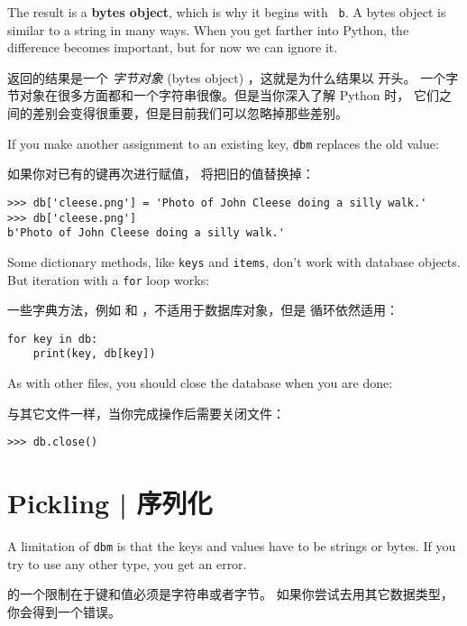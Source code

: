 {{{{{{{%
The result is a {\bf bytes object}, which is why it begins with {\tt
  b}.  A bytes object is similar to a string in many ways.  When you
get farther into Python, the difference becomes important, but for now
we can ignore it.

返回的结果是一个 {\em 字节对象} (bytes object) ，这就是为什么结果以  开头。
一个字节对象在很多方面都和一个字符串很像。但是当你深入了解 Python 时，
它们之间的差别会变得很重要，但是目前我们可以忽略掉那些差别。

  

If you make another assignment to an existing key, {\tt dbm} replaces
the old value:

如果你对已有的键再次进行赋值， 将把旧的值替换掉：


\begin{lstlisting}
>>> db['cleese.png'] = 'Photo of John Cleese doing a silly walk.'
>>> db['cleese.png']
b'Photo of John Cleese doing a silly walk.'
\end{lstlisting}
%

Some dictionary methods, like {\tt keys} and {\tt items}, don't
work with database objects.  But iteration with a {\tt for}
loop works:

一些字典方法，例如  和  ，不适用于数据库对象，但是  循环依然适用：

\begin{lstlisting}
for key in db:
    print(key, db[key])
\end{lstlisting}
%
As with other files, you should close the database when you are
done:

与其它文件一样，当你完成操作后需要关闭文件：

\begin{lstlisting}
>>> db.close()
\end{lstlisting}
%
  


\section{Pickling  |  序列化}

A limitation of {\tt dbm} is that the keys and values have to be
strings or bytes.  If you try to use any other type, you get an error.

 的一个限制在于键和值必须是字符串或者字节。
如果你尝试去用其它数据类型，你会得到一个错误。
 

}}}}}}}
